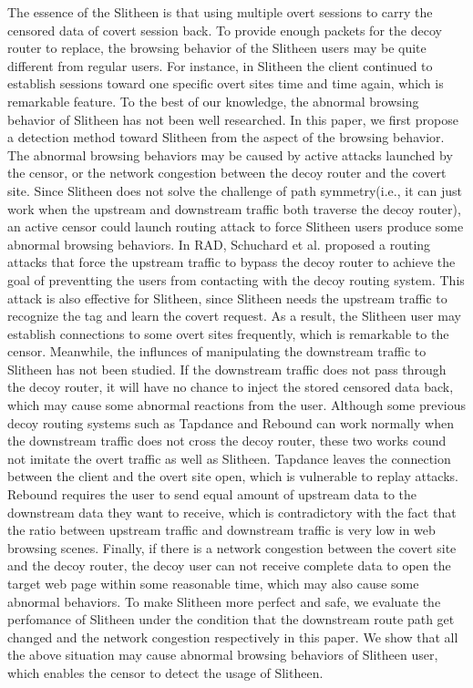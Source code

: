 \documentclass[conference]{IEEEtran}
\begin{document}
The essence of the Slitheen is that using multiple overt sessions to carry the censored data of covert session back. To provide enough packets for the decoy router to replace, the browsing behavior of the Slitheen users may be quite different from regular users. For instance, in Slitheen the client continued to establish sessions toward one specific overt sites time and time again, which is remarkable feature.  To the best of our knowledge, the abnormal browsing behavior of Slitheen has not been well researched. In this paper, we first propose a detection method toward Slitheen from the aspect of the browsing behavior. The abnormal browsing behaviors may be caused by active attacks launched by the censor, or the network congestion between the decoy router and the covert site. Since Slitheen does not solve the challenge of path symmetry(i.e., it can just work when the upstream and downstream traffic both traverse the decoy router), an active censor could launch routing attack to force Slitheen users produce some abnormal browsing behaviors. In RAD\cite{rad}, Schuchard et al. proposed a routing attacks that force the upstream traffic to bypass the decoy router to achieve the goal of preventting the users from contacting with the decoy routing system. This attack is also effective for Slitheen, since Slitheen needs the upstream traffic to recognize the tag and learn the covert request. As a result, the Slitheen user may establish connections to some overt sites frequently, which is remarkable to the censor. Meanwhile, the influnces of manipulating the downstream traffic to Slitheen has not been studied. If the downstream traffic does not pass through the decoy router, it will have no chance to inject the stored censored data back, which may cause some abnormal reactions from the user. Although some previous decoy routing systems such as Tapdance\cite{tapdance} and Rebound\cite{rebound} can work normally when the downstream traffic does not cross the decoy router, these two works cound not imitate the overt traffic as well as Slitheen. Tapdance leaves the connection between the client and the overt site open, which is vulnerable to replay attacks. Rebound requires the user to send equal amount of upstream data to the downstream data they want to receive, which is contradictory with the fact that the ratio between upstream traffic and downstream traffic is very low in web browsing scenes. Finally, if there is a network congestion between the covert site and the decoy router, the decoy user can not receive complete data to open the target web page within some reasonable time, which may also cause some abnormal behaviors. To make Slitheen more perfect and safe, we evaluate the perfomance of Slitheen under the condition that the downstream route path get changed and the network congestion respectively in this paper. We show that all the above situation may cause abnormal browsing behaviors  of Slitheen user, which enables the censor to detect the usage of Slitheen.
\end{document}
